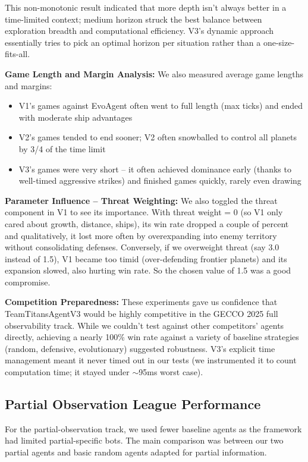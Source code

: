 \documentclass[conference]{IEEEtran}
\begin{document}
This non-monotonic result indicated that more depth isn't always better in a time-limited context; medium horizon struck the best balance between exploration breadth and computational efficiency. V3's dynamic approach essentially tries to pick an optimal horizon per situation rather than a one-size-fits-all.

\textbf{Game Length and Margin Analysis:} We also measured average game lengths and margins:
\begin{itemize}
\item V1's games against EvoAgent often went to full length (max ticks) and ended with moderate ship advantages
\item V2's games tended to end sooner; V2 often snowballed to control all planets by 3/4 of the time limit
\item V3's games were very short -- it often achieved dominance early (thanks to well-timed aggressive strikes) and finished games quickly, rarely even drawing
\end{itemize}

\textbf{Parameter Influence -- Threat Weighting:} We also toggled the threat component in V1 to see its importance. With threat weight = 0 (so V1 only cared about growth, distance, ships), its win rate dropped a couple of percent and qualitatively, it lost more often by overexpanding into enemy territory without consolidating defenses. Conversely, if we overweight threat (say 3.0 instead of 1.5), V1 became too timid (over-defending frontier planets) and its expansion slowed, also hurting win rate. So the chosen value of 1.5 was a good compromise.

\textbf{Competition Preparedness:} These experiments gave us confidence that TeamTitansAgentV3 would be highly competitive in the GECCO 2025 full observability track. While we couldn't test against other competitors' agents directly, achieving a nearly 100\% win rate against a variety of baseline strategies (random, defensive, evolutionary) suggested robustness. V3's explicit time management meant it never timed out in our tests (we instrumented it to count computation time; it stayed under $\sim$95ms worst case).

\subsection{Partial Observation League Performance}

For the partial-observation track, we used fewer baseline agents as the framework had limited partial-specific bots. The main comparison was between our two partial agents and basic random agents adapted for partial information.
\end{document}
